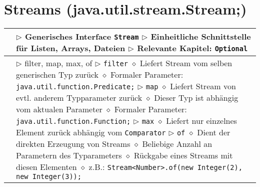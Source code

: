 	
\section{Streams (java.util.stream.Stream;)}
	\begin{tabular}{ | p{4cm} p{13.5cm} | }
	\hline
	
	\makecell[l]{Information} & \makecell[l]{$\rhd$ Generisches Interface \texttt{Stream} \\
	$\rhd$ Einheitliche Schnittstelle für Listen, Arrays, Dateien \\
	$\rhd$ Relevante Kapitel: \texttt{Optional} \\
	} \\ \hline

	\makecell[l]{Methodenzusammenfassung} & \makecell[l]{$\rhd$ filter, map, max, of \\
	$\rhd$ \texttt{filter} \\
	\hspace{0.4cm} $\diamond$ Liefert Stream vom selben generischen Typ zurück \\
	\hspace{0.4cm} $\diamond$ Formaler Parameter: \texttt{java.util.function.Predicate;} \\
	$\rhd$ \texttt{map} \\
	\hspace{0.4cm} $\diamond$ Liefert Stream von evtl. anderem Typparameter zurück \\
	\hspace{0.4cm} $\diamond$ Dieser Typ ist abhängig vom aktualen Parameter \\
	\hspace{0.4cm} $\diamond$ Formaler Parameter: \texttt{java.util.function.Function;} \\
	$\rhd$ \texttt{max} \\
	\hspace{0.4cm} $\diamond$ Liefert nur einzelnes Element zurück abhängig vom \texttt{Comparator} \\
	$\rhd$ \texttt{of} \\
	\hspace{0.4cm} $\diamond$ Dient der direkten Erzeugung von Streams \\
	\hspace{0.4cm} $\diamond$ Beliebige Anzahl an Parametern des Typarameters \\
	\hspace{0.4cm} $\diamond$ Rückgabe eines Streams mit diesen Elementen \\
	\hspace{0.4cm} $\diamond$ z.B.: \texttt{Stream<Number>.of(new Integer(2), new Integer(3));} \\
}
\end{tabular}
